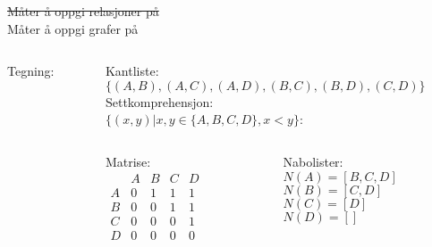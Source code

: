 \begin{frame}[fragile]{\st{Måter å oppgi relasjoner på}\\ Måter å oppgi grafer på}
    \begin{columns}
        \begin{column}{0.3\textwidth}
            Tegning:

        \end{column}
        \begin{column}{0.65\textwidth}
            Kantliste:\\
            $\{(A, B), (A, C), (A, D), (B, C), (B, D), (C, D)\}$\\[5mm]
            Settkomprehensjon:\\
            $\{(x, y) | x, y \in \{A,B,C,D\}, x < y\}$:\\[5mm]
            \begin{columns}
                \begin{column}{0.27\textwidth}
                    Matrise:\\
                    \begin{math}
                        \begin{matrix}
                              & A & B & C & D\\
                            A & 0 & 1 & 1 & 1\\
                            B & 0 & 0 & 1 & 1\\
                            C & 0 & 0 & 0 & 1\\
                            D & 0 & 0 & 0 & 0
                        \end{matrix}
                    \end{math}
                \end{column}
                \begin{column}{0.38\textwidth}
                    Nabolister:\\        
                    $N(A) = [B, C, D]$\\
                    $N(B) = [C, D]$\\
                    $N(C) = [D]$\\
                    $N(D) = []$
                \end{column} 
            \end{columns}
        \end{column}
    \end{columns}
\end{frame}